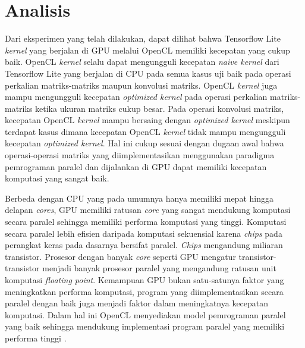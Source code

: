 \section{Analisis }
Dari eksperimen yang telah dilakukan, dapat dilihat bahwa Tensorflow Lite \textit{kernel} yang berjalan di GPU melalui OpenCL memiliki kecepatan yang cukup baik. OpenCL \textit{kernel} selalu dapat mengungguli kecepatan \textit{naive kernel} dari Tensorflow Lite yang berjalan di CPU pada semua kasus uji baik pada operasi perkalian matriks-matriks maupun konvolusi matriks. OpenCL \textit{kernel} juga mampu mengungguli kecepatan \textit{optimized kernel} pada operasi perkalian matriks-matriks ketika ukuran matriks cukup besar. Pada operasi konvolusi matriks, kecepatan OpenCL \textit{kernel} mampu bersaing dengan \textit{optimized kernel} meskipun terdapat kasus dimana kecepatan OpenCL \textit{kernel} tidak mampu mengungguli kecepatan \textit{optimized kernel}. Hal ini cukup sesuai dengan dugaan awal bahwa operasi-operasi matriks yang diimplementasikan menggunakan paradigma pemrograman paralel dan dijalankan di GPU dapat memiliki kecepatan komputasi yang sangat baik. 

Berbeda dengan CPU yang pada umumnya hanya memiliki mepat hingga delapan \textit{cores}, GPU memiliki ratusan \textit{core} yang sangat mendukung komputasi secara paralel sehingga memiliki performa komputasi yang tinggi. Komputasi secara paralel lebih efisien daripada komputasi sekuensial karena \textit{chips} pada perangkat keras pada dasarnya bersifat paralel. \textit{Chips} mengandung miliaran transistor. Prosesor dengan banyak \textit{core} seperti GPU mengatur transistor-transistor menjadi banyak prosesor paralel yang mengandung ratusan unit komputasi \textit{floating point}. Kemampuan GPU bukan satu-satunya faktor yang meningkatkan performa komputasi, program yang diimplementasikan secara paralel dengan baik juga menjadi faktor dalam meningkatnya kecepatan komputasi. Dalam hal ini OpenCL menyediakan model pemrograman paralel yang baik sehingga mendukung implementasi program paralel yang memiliki performa tinggi \cite{openclguide}. 

